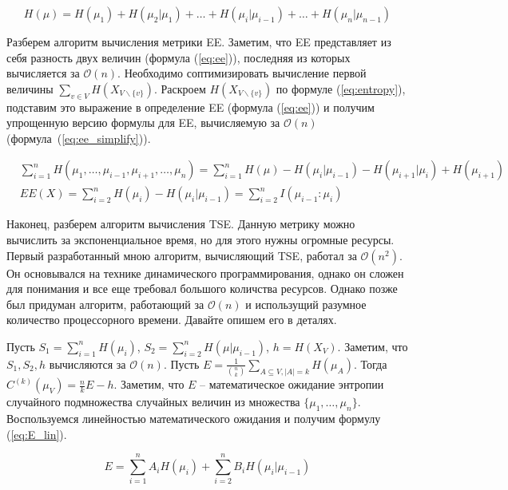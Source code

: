 \documentclass{spbau-diploma}
\begin{document}
\begin{equation} \label{eq:entropy}
H(\mu) = H(\mu_1) + H(\mu_2|\mu_1) + \ldots + H(\mu_i|\mu_{i-1}) + \ldots + H(\mu_n|\mu_{n-1})
\end{equation}

Разберем алгоритм вычисления метрики EE. Заметим, что EE представляет из себя разность двух величин (формула (\ref{eq:ee})), последняя из которых вычисляется за $\mathcal{O}(n)$. Необходимо соптимизировать вычисление первой величины $\sum\limits_{v\in V}H(X_{V\backslash\{v\}})$. Раскроем $H(X_{V\backslash\{v\}})$ по формуле (\ref{eq:entropy}), подставим это выражение в определение EE (формула (\ref{eq:ee})) и получим упрощенную версию формулы для EE, вычисляемую за $\mathcal{O}(n)$ (формула~(\ref{eq:ee_simplify})).

\begin{equation} \label{eq:ee_simplify}
\begin{split}
& \sum\limits_{i=1}^{n}H(\mu_1,\ldots,\mu_{i-1},\mu_{i+1},\ldots,\mu_n) =
\sum\limits_{i=1}^{n}H(\mu) - H(\mu_i|\mu_{i-1}) - H(\mu_{i+1}|\mu_i) + H(\mu_{i+1}) \\
& EE(X) = \sum\limits_{i=2}^{n}H(\mu_i) - H(\mu_i|\mu_{i-1})= \sum\limits_{i=2}^{n}I(\mu_{i-1}\colon\mu_i)
\end{split}
\end{equation}

Наконец, разберем алгоритм вычисления TSE. Данную метрику можно вычислить за экспоненциальное время, но для этого нужны огромные ресурсы. Первый разработанный мною алгоритм, вычисляющий TSE, работал за $\mathcal{O}(n^2)$. Он основывался на технике динамического программирования, однако он сложен для понимания и все еще требовал большого количства ресурсов. Однако позже был придуман алгоритм, работающий за $\mathcal{O}(n)$ и использущий разумное количество процессорного времени. Давайте опишем его в деталях.

Пусть $S_1 = \sum\limits_{i=1}^{n}H(\mu_i)$, $S_2 = \sum\limits_{i=2}^{n}H(\mu|\mu_{i-1})$, $h = H(X_V)$. Заметим, что $S_1,S_2,h$ вычисляются за $\mathcal{O}(n)$. Пусть $E = \frac{1}{\binom{n}{k}}\sum\limits_{A\subseteq V,|A|=k}H(\mu_A)$. Тогда $C^{(k)}(\mu_V) = \frac{n}{k}E - h$. Заметим, что $E$ -- математическое ожидание энтропии случайного подмножества случайных величин из множества $\{\mu_1,\ldots,\mu_n\}$. Воспользуемся линейностью математического ожидания и получим формулу (\ref{eq:E_lin}).

\begin{equation} \label{eq:E_lin}
E = \sum\limits_{i=1}^{n}A_iH(\mu_i) + \sum\limits_{i=2}^{n}B_iH(\mu_i|\mu_{i-1})
\end{equation}
\end{document}
